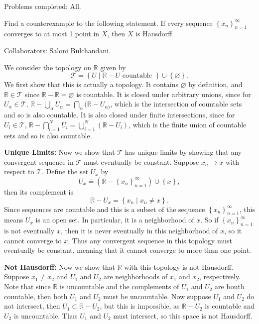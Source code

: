 \documentclass[10pt]{report}
\begin{document}
{\color{blue}Problems completed: All.}

\begin{exer}[6 points]
Find a counterexample to the following statement. If every sequence $\left\{ x_n \right\}_{n=1}^\infty$ converges to at most 1 point in $X$, then $X$ is Hausdorff.
\end{exer}
{\color{blue}Collaborators: Saloni Bulchandani.}

We consider the topology on $\mathbb{R}$ given by
\[
	\mathcal{T} = \left\{ U \;|\; \mathbb{R} - U \text{ countable } \right\} \cup \left\{ \varnothing \right\}.
\] We first show that this is actually a topology. It contains $\varnothing$ by definition, and $\mathbb{R} \in \mathcal{T}$ since $\mathbb{R}-\mathbb{R}=\varnothing$ is countable. It is closed under arbitrary unions, since for $U_{\alpha}\in \mathcal{T}$, $\mathbb{R}-\bigcup_{\alpha}U_{\alpha} = \bigcap_{\alpha}(\mathbb{R}-U_{\alpha)}$, which is the intersection of countable sets and so is also countable. It is also closed under finite intersections, since for $U_{i} \in \mathcal{T}$, $\mathbb{R}-\bigcap_{i=1}^N U_i = \bigcup_{i=1}^N (\mathbb{R}-U_i)$, which is the finite union of countable sets and so is also countable.

\textbf{Unique Limits:} Now we show that $\mathcal{T}$ has unique limits by showing that any convergent sequence in $\mathcal{T}$ must eventually be constant. Suppose $x_n \to x$ with respect to $\mathcal{T}$. Define the set $U_x$ by
\[
	U_x \doteq \left(  \mathbb{R}-\left\{ x_n \right\}_{n=1}^\infty \right)\cup\left\{ x \right\},
\]
then its complement is
\[
\mathbb{R}-U_x = \left\{ x_n \;|\; x_n \neq x \right\}.
\] Since sequences are countable and this is a subset of the sequence $\left\{ x_n \right\}_{n=1}^\infty$, this means $U_x$ is an open set. In particular, it is a neighborhood of $x$. So if $\left\{ x_n \right\}_{n=1}^\infty$ is not eventually $x$, then it is never eventually in this neighborhood of $x$, so it cannot converge to $x$. Thus any convergent sequence in this topology must eventually be constant, meaning that it cannot converge to more than one point.

\textbf{Not Hausdorff:} Now we show that $\mathbb{R}$ with this topology is not Hausdorff. Suppose $x_1\neq x_2$ and $U_1$ and $U_2$ are neighborhoods of $x_1$ and $x_2$, respectively. Note that since $\mathbb{R}$ is uncountable and the complements of $U_1$ and $U_2$ are bouth countable, then both $U_1$ and $U_2$ must be uncountable. Now suppose $U_1$ and $U_2$ do not intersect, then $U_1 \subset \mathbb{R}-U_2$, but this is impossible, as $\mathbb{R}-U_2$ is countable and $U_2$ is uncountable. Thus $U_1$ and $U_2$ must intersect, so this space is not Hausdorff.
\pagebreak
\end{document}
